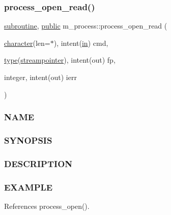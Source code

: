 \subsubsection{\texorpdfstring{process\+\_\+open\+\_\+read()}{process\_open\_read()}}
{\footnotesize\ttfamily \hyperlink{M__stopwatch_83_8txt_acfbcff50169d691ff02d4a123ed70482}{subroutine}, \hyperlink{M__stopwatch_83_8txt_a2f74811300c361e53b430611a7d1769f}{public} m\+\_\+process\+::process\+\_\+open\+\_\+read (\begin{DoxyParamCaption}\item[{\hyperlink{option__stopwatch_83_8txt_abd4b21fbbd175834027b5224bfe97e66}{character}(len=$\ast$), intent(\hyperlink{M__journal_83_8txt_afce72651d1eed785a2132bee863b2f38}{in})}]{cmd,  }\item[{\hyperlink{stop__watch_83_8txt_a70f0ead91c32e25323c03265aa302c1c}{type}(\hyperlink{structm__process_1_1streampointer}{streampointer}), intent(out)}]{fp,  }\item[{integer, intent(out)}]{ierr }\end{DoxyParamCaption})}



\subsubsection*{N\+A\+ME}

\subsubsection*{S\+Y\+N\+O\+P\+S\+IS}

\subsubsection*{D\+E\+S\+C\+R\+I\+P\+T\+I\+ON}

\subsubsection*{E\+X\+A\+M\+P\+LE}

References process\+\_\+open().

\mbox{\label{namespacem__process_aa6ed1404ab3472f5068ed15a7a01defc}} 
